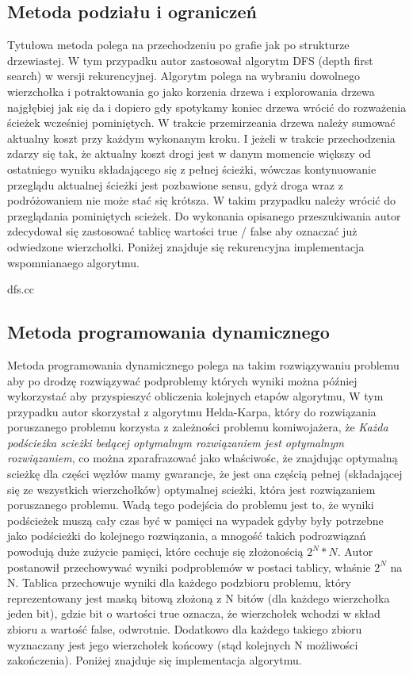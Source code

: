\documentclass[polish,polish,a4paper]{article}
\begin{document}
\subsection{Metoda podziału i ograniczeń}
Tytułowa metoda polega na przechodzeniu po grafie jak po strukturze drzewiastej. W tym przypadku autor zastosował algorytm DFS (depth first search) w wersji rekurencyjnej.
Algorytm polega na wybraniu dowolnego wierzchołka i potraktowania go jako korzenia drzewa i explorowania drzewa najgłębiej jak się da i dopiero gdy spotykamy koniec drzewa wrócić do
rozważenia ścieżek wcześniej pominiętych. W trakcie przemirzeania drzewa należy sumować aktualny koszt przy każdym wykonanym kroku. I jeżeli w trakcie przechodzenia zdarzy się tak, że
aktualny koszt drogi jest w danym momencie większy od ostatniego wyniku składającego się z pełnej ścieżki, wówczas kontynuowanie przeglądu aktualnej ścieżki jest pozbawione sensu,
gdyż droga wraz z podróżowaniem nie może stać się krótsza. W takim przypadku należy wrócić do przeglądania pominiętych scieżek. Do wykonania opisanego przeszukiwania autor
zdecydował się zastosować tablicę wartości true / false aby oznaczać już odwiedzone wierzchołki.
Poniżej znajduje się rekurencyjna implementacja wspomnianaego algorytmu.

{dfs.cc}

\subsection{Metoda programowania dynamicznego}

Metoda programowania dynamicznego polega na takim rozwiązywaniu problemu aby po drodzę rozwiązywać podproblemy których wyniki można później wykorzystać aby przyspieszyć obliczenia
kolejnych etapów algorytmu, W tym przypadku autor skorzystał z algorytmu Helda-Karpa, który do rozwiązania poruszanego problemu korzysta z zależności problemu komiwojażera, że
\textit{Każda podścieżka scieżki bedącej optymalnym rozwiązaniem jest optymalnym rozwiązaniem}, co można zparafrazować jako właściwośc, że znajdując optymalną scieżkę dla części
węzłów mamy gwarancje, że jest ona częścią pełnej (składającej się ze wszystkich wierzchołków) optymalnej scieżki, która jest rozwiązaniem poruszanego problemu.
Wadą tego podejścia do problemu jest to, że wyniki podścieżek muszą cały czas być w pamięci na wypadek gdyby były potrzebne jako podścieżki do kolejnego rozwiązania, a mnogość
takich podrozwiązań powodują duże zużycie pamięci, które cechuje się złożonością ${2^N*N}$. Autor postanowił przechowywać wyniki podproblemów w postaci tablicy, właśnie
${2^N}$ na N. Tablica przechowuje wyniki dla każdego podzbioru problemu, który reprezentowany jest maską bitową złożoną z N bitów (dla każdego wierzchołka jeden bit), gdzie bit o wartości
true oznacza, że wierzchołek wchodzi w skład zbioru a wartość false, odwrotnie.
Dodatkowo dla każdego takiego zbioru wyznaczany jest jego wierzchołek końcowy (stąd kolejnych N możliwości zakończenia).
Poniżej znajduje się implementacja algorytmu.
\end{document}
